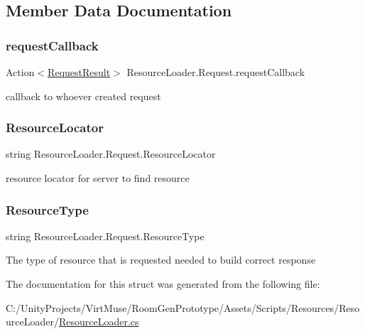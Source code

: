 \subsection{Member Data Documentation}
\mbox{\label{struct_resource_loader_1_1_request_a9181d63264ecb18ff27bfd27eb1eeaf6}} 
\subsubsection{\texorpdfstring{request\+Callback}{requestCallback}}
{\footnotesize\ttfamily Action$<$\mbox{\hyperlink{struct_resource_loader_1_1_request_result}{Request\+Result}}$>$ Resource\+Loader.\+Request.\+request\+Callback}



callback to whoever created request 

\mbox{\label{struct_resource_loader_1_1_request_aa5c217683710db8ab1f700365acb8d19}} 
\subsubsection{\texorpdfstring{Resource\+Locator}{ResourceLocator}}
{\footnotesize\ttfamily string Resource\+Loader.\+Request.\+Resource\+Locator}



resource locator for server to find resource 

\mbox{\label{struct_resource_loader_1_1_request_a349cfa36f1c8a461d5475f073a5afccb}} 
\subsubsection{\texorpdfstring{Resource\+Type}{ResourceType}}
{\footnotesize\ttfamily string Resource\+Loader.\+Request.\+Resource\+Type}



The type of resource that is requested needed to build correct response 



The documentation for this struct was generated from the following file\+:\begin{DoxyCompactItemize}
\item 
C\+:/\+Unity\+Projects/\+Virt\+Muse/\+Room\+Gen\+Prototype/\+Assets/\+Scripts/\+Resources/\+Resource\+Loader/\mbox{\hyperlink{_resource_loader_8cs}{Resource\+Loader.\+cs}}\end{DoxyCompactItemize}
